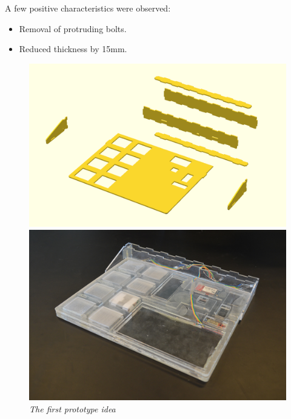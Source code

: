 A few positive characteristics were observed:
\begin{itemize} \itemsep0em
  \item Removal of protruding bolts.
  \item Reduced thickness by 15mm.
\end{itemize}


\begin{figure}[h]
\begin{minipage}[b]{.5\textwidth}
\includegraphics[width=1.05\textwidth]{figures/iterations/v1.png}
\end{minipage}
\begin{minipage}[b]{.5\textwidth}
\includegraphics[width=1\textwidth]{figures/iterations/v1-photo.jpg}
\end{minipage}
\caption{\small {\it {The first prototype idea}}} 
\label{fig:v1}
\end{figure}

